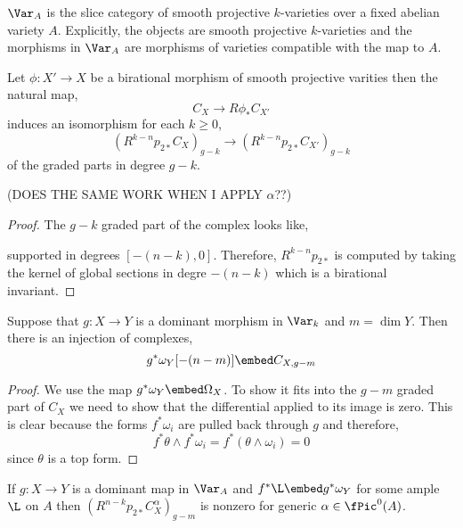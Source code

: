 \documentclass[12pt]{article}
\begin{document}
\begin{defn}
$\Var_A$ is the slice category of smooth projective $k$-varieties over a fixed abelian variety $A$. Explicitly, the objects are smooth projective $k$-varieties and the morphisms in $\Var_A$ are morphisms of varieties compatible with the map to $A$.
\end{defn}

\begin{prop}
Let $\phi :  X' \to X$ be a birational morphism of smooth projective varities then the natural map,
\[ C_{X} \to R \phi_* C_{X'} \]
induces an isomorphism for each $k \ge 0$,
\[ (R^{k-n} p_{2 *} C_{X})_{g-k} \to (R^{k-n} p_{2 *} C_{X'})_{g-k} \]
of the graded parts in degree $g-k$.
\end{prop}

(DOES THE SAME WORK WHEN I APPLY $\alpha$??)

\begin{proof}
The $g-k$ graded part of the complex looks like,
\begin{center}
\end{center}
supported in degrees $[-(n-k), 0]$. Therefore, $R^{k-n} p_{2*}$ is computed by taking the kernel of global sections in degre $-(n-k)$ which is a birational invariant. 
\end{proof}

\begin{lemma}
Suppose that $g : X \to Y$ is a dominant morphism in $\Var_k$ and $m = \dim{Y}$. Then there is an injection of complexes,
\[ g^* \omega_Y[-(n-m)] \embed C_{X,g-m} \]
\end{lemma}

\begin{proof}
We use the map $g^* \omega_Y \embed \Omega_{X}$. To show it fits into the $g-m$ graded part of $C_X$ we need to show that the differential applied to its image is zero. This is clear because the forms $f^* \omega_i$ are pulled back through $g$ and therefore,
\[ f^* \theta \wedge f^* \omega_i = f^* (\theta \wedge \omega_i) = 0 \]
since $\theta$ is a top form. 
\end{proof}

\begin{prop}
If $g : X \to Y$ is a dominant map in $\Var_A$ and $f^* \L \embed g^* \omega_Y$ for some ample $\L$ on $A$ then $(R^{n-k} p_{2*} C_{X}^\alpha)_{g-m}$ is nonzero for generic $\alpha \in \fPic^0(A)$.
\end{prop}
\end{document}

